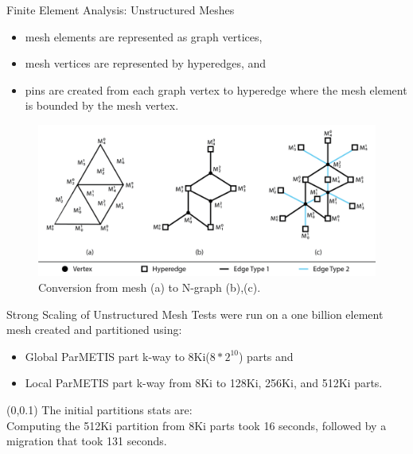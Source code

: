 \documentclass{beamer}
\begin{document}
\begin{textblock}{15.6}
\begin{textblock}{5}
\begin{block}{Finite Element Analysis: Unstructured Meshes}
      \begin{itemize}
      \item mesh elements are represented as graph vertices,
      \item mesh vertices are represented by hyperedges, and
      \item pins are created from each graph vertex to hyperedge where the mesh element is bounded by the mesh vertex.
      \end{itemize}
      \begin{figure}
        \centering
        \includegraphics[width=.7\textwidth]{../figures/exampleMesh2Graph_backgroundless.png}
        \caption{Conversion from mesh (a) to N-graph (b),(c).}
      \end{figure}
    \end{block}
    \begin{block}{Strong Scaling of Unstructured Mesh}
      Tests were run on a one billion element mesh created and partitioned using:
      \begin{itemize}
      \item Global ParMETIS part k-way to 8Ki($8*2^{10}$) parts and
      \item Local ParMETIS part k-way from 8Ki to 128Ki, 256Ki, and 512Ki parts.
      \end{itemize}
      \begin{textblock}{2.3}(0,0.1)
        The initial partitions stats are: \\[1cm]

        Computing the 512Ki partition from 8Ki parts took 16 seconds, followed by a migration that took 131 seconds.
        

\end{textblock}
\end{block}
\end{textblock}
\end{textblock}
\end{document}
